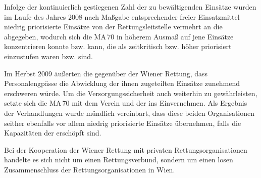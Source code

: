 {Infolge der kontinuierlich gestiegenen Zahl der zu
bewältigenden Einsätze wurden im Laufe des Jahres 2008 nach
Maßgabe entsprechender freier Einsatzmittel niedrig
priorisierte Einsätze von der Rettungsleitstelle vermehrt an
die  abgegeben, wodurch sich die
MA\,70 in höherem Ausmaß auf jene Einsätze
konzentrieren konnte bzw. kann, die als zeitkritisch bzw.
höher priorisiert einzustufen waren bzw. sind. 
\citep{KontrollamtWienKA-K-13-09}

Im Herbst 2009 äußerten die  gegenüber der
Wiener Rettung, dass Personalengpässe die Abwicklung der
ihnen zugeteilten Einsätze zunehmend erschweren würde. Um die
Versorgungssicherheit auch weiterhin zu gewährleisten, setzte
sich die MA\,70 mit dem Verein  und der  ins Einvernehmen. Als Ergebnis der Verhandlungen wurde
mündlich vereinbart, dass diese beiden Organisationen seither
ebenfalls vor allem niedrig priorisierte Einsätze übernehmen,
falls die Kapazitäten der  erschöpft sind.
\citep{KontrollamtWienKA-K-13-09}}

Bei der Kooperation der Wiener Rettung mit privaten
Rettungsorganisationen handelte es sich nicht um einen 
Rettungsverbund, sondern um einen losen Zusammenschluss der
Rettungsorganisationen in Wien. 
\citep{KontrollamtWienKA-K-13-09}
{}
{}
{}
{}


% 

\ChapterEnd
